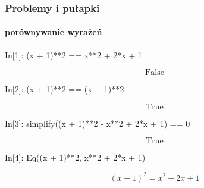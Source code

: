 \documentclass[10pt]{beamer}
\begin{document}
\begin{frame}[fragile]
  \frametitle{Problemy i pułapki}
  \framesubtitle{porównywanie wyrażeń}

  \begin{python}
    In[1]: (x + 1)**2 == x**2 + 2*x + 1
  \end{python}
  \begin{equation*}
    \mathrm{False}
  \end{equation*}

  \begin{python}
    In[2]: (x + 1)**2 == (x + 1)**2
  \end{python}
  \begin{equation*}
    \mathrm{True}
  \end{equation*}

  \begin{python}
    In[3]: simplify((x + 1)**2 - x**2 + 2*x + 1) == 0
  \end{python}
  \begin{equation*}
    \mathrm{True}
  \end{equation*}

  \pause

  \begin{python}
    In[4]: Eq((x + 1)**2, x**2 + 2*x + 1)
  \end{python}
  \begin{equation*}
    \left(x + 1\right)^{2} = x^{2} + 2 x + 1
  \end{equation*}


\end{frame}
\end{document}
